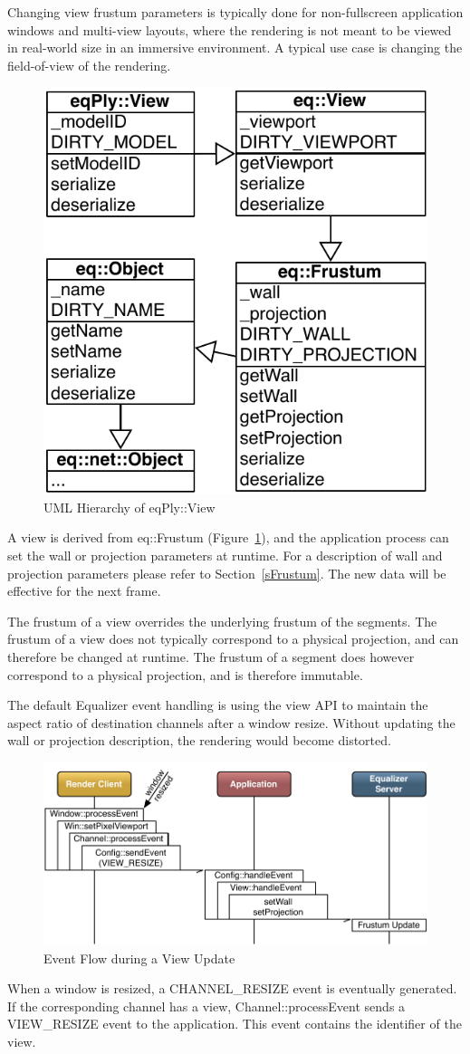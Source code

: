 \documentclass[10pt,a4]{scrartcl}
\newcommand{\fig}[1]{Figure~\ref{#1}}
\newcommand{\sref}[1]{Section~\ref{#1}}
\begin{document}
Changing view frustum parameters is typically done for non-fullscreen
application windows and multi-view layouts, where the rendering is not
meant to be viewed in real-world size in an immersive environment. A
typical use case is changing the field-of-view of the rendering.

\begin{figure}
  \includegraphics[width=.382\textwidth]{images/viewUML.pdf}
  {\caption{\label{fViewUML}UML Hierarchy of \textsf{eqPly::View}}}
\end{figure}
A view is derived from \textsf{eq::Frustum} (\fig{fViewUML}), and the
application process can set the wall or projection parameters at
runtime. For a description of wall and projection parameters please refer
to \sref{sFrustum}. The new data will be effective for the next frame.

The frustum of a view overrides the underlying frustum of the
segments. The frustum of a view does not typically correspond to a
physical projection, and can therefore be changed at runtime. The
frustum of a segment does however correspond to a physical projection,
and is therefore immutable.

The default Equalizer event handling is using the view API to maintain
the aspect ratio of destination channels after a window resize. Without
updating the wall or projection description, the rendering would become
distorted.

\begin{figure}
  \includegraphics[width=.618\textwidth]{images/viewUpdate.pdf}
  {\caption{\label{fViewUpdate}Event Flow during a View Update}}
\end{figure}
When a window is resized, a \textsf{CHANNEL\_RESIZE} event is eventually
generated. If the corresponding channel has a view,
\textsf{Channel::processEvent} sends a \textsf{VIEW\_RESIZE} event to
the application. This event contains the identifier of the view. 
\end{document}
